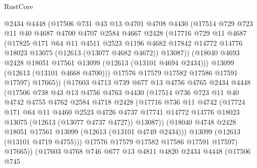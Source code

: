 \begin{lexlean}{RustCore}
\begin{coremodule}
            @2434
            @4448
            (@17506
              @731
              @43
              @13
              @4701
              @4708
              @4430
              (@17514
                @729
                @723
                @11
                @40
                @4687
                @4700
                @4707
                @2584
                @4667
                @2428
                (@17716
                  @729
                  @11
                  @4687
                  (@17825
                    @171
                    @64
                    @11
                    @4511
                    @2523
                    @1196
                    @4682
                    @17842
                    @14772
                    @14776
                    @18023
                    @13075
                    (@12613 (@13077 @4682 @4672))
                    @13087))
                (@18040 @4693 @2428 @18051 @17561 @13099 (@12613 (@13101 @4694 @2434)))
                @13099
                (@12613 (@13101 @4668 @4700)))
              @17576
              @17579
              @17582
              @17586
              @17591
              @17597)
            @17665))
        (@17603
          @4713
          @739
          @677
          @13
          @4756
          @4765
          @2434
          @4448
          (@17506
            @738
            @43
            @13
            @4756
            @4763
            @4430
            (@17514
              @736
              @723
              @11
              @40
              @4742
              @4755
              @4762
              @2584
              @4718
              @2428
              (@17716
                @736
                @11
                @4742
                (@17724
                  @171
                  @64
                  @11
                  @4460
                  @2523
                  @4726
                  @4737
                  @17741
                  @14772
                  @14776
                  @18023
                  @13075
                  (@12613 (@13077 @4737 @4727))
                  @13087))
              (@18040 @4748 @2428 @18051 @17561 @13099 (@12613 (@13101 @4749 @2434)))
              @13099
              (@12613 (@13101 @4719 @4755)))
            @17576
            @17579
            @17582
            @17586
            @17591
            @17597)
          @17665))
      (@17603
        @4768
        @746
        @677
        @13
        @4811
        @4820
        @2434
        @4448
        (@17506
          @745

\end{coremodule}
\end{lexlean}
